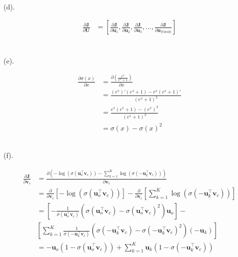 \documentclass{article}
\begin{document}
~\\

(d).

\begin{equation*}
  \begin{aligned}
    \frac{\partial \boldsymbol{J}}{\partial \boldsymbol{U}} &= \left[\frac{\partial \boldsymbol{J}}{\partial \boldsymbol{u}_1}, \frac{\partial \boldsymbol{J}}{\partial \boldsymbol{u}_2}, \frac{\partial \boldsymbol{J}}{\partial \boldsymbol{u}_3}, ... , \frac{\partial \boldsymbol{J}}{\partial \boldsymbol{u}_{|Vocab|}} \right] \\ 
  \end{aligned}
\end{equation*}

~\\ 

(e). 

\begin{equation*}
  \begin{aligned}
    \frac{\partial \sigma (x)}{\partial x} &= \frac{\partial (\frac{e^x}{e^x + 1})}{\partial x} \\ 
    & = \frac{(e^x)'(e^x+1) - e^x(e^x+1)'}{(e^x + 1)^2} \\ 
    & = \frac{e^x(e^x +1) - (e^x)^2}{(e^x + 1)^2} \\
    & = \sigma (x) - \sigma(x)^2
  \end{aligned}
\end{equation*}

~\\

(f). 

\begin{equation*}
  \begin{aligned}
    \frac{\partial \boldsymbol{J}}{\partial \boldsymbol{v}_c} &= \frac{\partial (-\log \left(\sigma\left(\boldsymbol{u}_{o}^{\top} \boldsymbol{v}_{c}\right)\right)-\sum_{k=1}^{K} \log \left(\sigma\left(-\boldsymbol{u}_{k}^{\top} \boldsymbol{v}_{c}\right)\right))}{\partial \boldsymbol{v}_c} \\ 
    & = \frac{\partial}{\partial \boldsymbol{v}_c} \left[- \log (\sigma(\boldsymbol{u}_{o}^{\top} \boldsymbol{v}_{c}))\right] - \frac{\partial}{\partial \boldsymbol{v}_c}\left[\sum_{k=1}^{K} \log (\sigma(-\boldsymbol{u}_{k}^{\top} \boldsymbol{v}_{c}))\right] \\
    & = \left[- \frac{1}{\sigma(\boldsymbol{u}_{o}^{\top} \boldsymbol{v}_{c})} \left(\sigma(\boldsymbol{u}_{o}^{\top} \boldsymbol{v}_{c}) - \sigma(\boldsymbol{u}_{o}^{\top} \boldsymbol{v}_{c})^2\right) \boldsymbol{u}_{o}\right] -  \\ &  \left[\sum_{k=1}^{K} \frac{1}{\sigma(-\boldsymbol{u}_{k}^{\top} \boldsymbol{v}_{c})} \left(\sigma(-\boldsymbol{u}_{k}^{\top} \boldsymbol{v}_{c}) - \sigma(-\boldsymbol{u}_{k}^{\top} \boldsymbol{v}_{c})^2\right)(-\boldsymbol{u}_{k})\right] \\ 
    & = - \boldsymbol{u}_{o} \left(1-\sigma(\boldsymbol{u}_{o}^{\top} \boldsymbol{v}_{c})\right) + \sum_{k=1}^{K}\boldsymbol{u}_{k}\left(1-\sigma(-\boldsymbol{u}_{k}^{\top} \boldsymbol{v}_{c})\right)
  \end{aligned}
\end{equation*}
\end{document}
